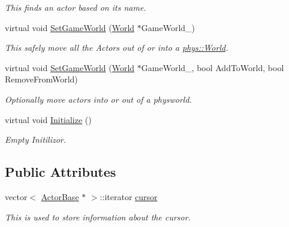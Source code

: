 \begin{DoxyCompactItemize}
\begin{DoxyCompactList}\small\item\em This finds an actor based on its name. \item\end{DoxyCompactList}\item 
virtual void \hyperlink{classphys_1_1ActorContainerVector_ab4c1394254057465f7a2f89b87dc49aa}{SetGameWorld} (\hyperlink{classphys_1_1World}{World} $\ast$GameWorld\_\-)
\begin{DoxyCompactList}\small\item\em This safely move all the Actors out of or into a \hyperlink{classphys_1_1World}{phys::World}. \item\end{DoxyCompactList}\item 
virtual void \hyperlink{classphys_1_1ActorContainerVector_a721d0cde6fc4f1e8d3b33867cd5c82df}{SetGameWorld} (\hyperlink{classphys_1_1World}{World} $\ast$GameWorld\_\-, bool AddToWorld, bool RemoveFromWorld)
\begin{DoxyCompactList}\small\item\em Optionally move actors into or out of a physworld. \item\end{DoxyCompactList}\item 
virtual void \hyperlink{classphys_1_1ActorContainerVector_adcebf4329a587669f74e1eacc1e6912c}{Initialize} ()
\begin{DoxyCompactList}\small\item\em Empty Initilizor. \item\end{DoxyCompactList}\end{DoxyCompactItemize}
\subsection*{Public Attributes}
\begin{DoxyCompactItemize}
\item 
vector$<$ \hyperlink{classphys_1_1ActorBase}{ActorBase} $\ast$ $>$::iterator \hyperlink{classphys_1_1ActorContainerVector_a08bdad9b15e265b5d44470f21766b6ed}{cursor}
\begin{DoxyCompactList}\small\item\em This is used to store information about the cursor. \item\end{DoxyCompactList}\end{DoxyCompactItemize}


